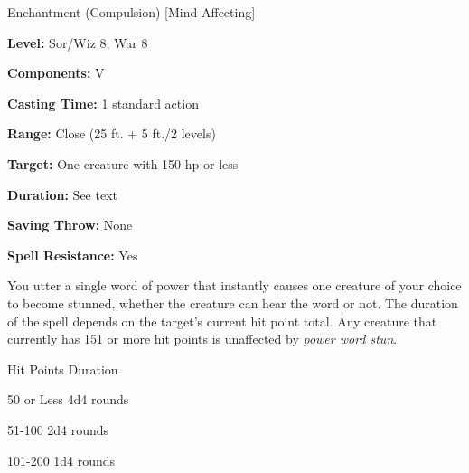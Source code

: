 
Enchantment (Compulsion) [Mind-Affecting]

\textbf{Level:} Sor/Wiz 8, War 8

\textbf{Components:} V

\textbf{Casting Time:} 1 standard action

\textbf{Range:} Close (25 ft. + 5 ft./2 levels)

\textbf{Target:} One creature with 150 hp or less

\textbf{Duration:} See text

\textbf{Saving Throw:} None

\textbf{Spell Resistance:} Yes

You utter a single word of power that instantly causes one creature of your choice 
to become stunned, whether the creature can hear the word or not. The duration 
of the spell depends on the target's current hit point total. Any creature that 
currently has 151 or more hit points is unaffected by \textit{power word stun}.

\begin{description*}
\item[Hit Points] Duration
\item[50 or Less] 4d4 rounds
\item[51-100] 2d4 rounds
\item[101-200] 1d4 rounds
\end{description*}
